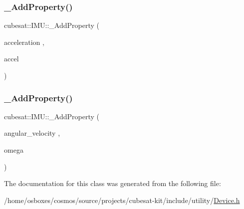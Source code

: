 \mbox{\label{classcubesat_1_1IMU_aedeb160bf398d47205b0206f1ee96fb7}} 
\subsubsection{\texorpdfstring{\+\_\+\+Add\+Property()}{\_AddProperty()}\hspace{0.1cm}{\footnotesize\ttfamily [8/9]}}
{\footnotesize\ttfamily cubesat\+::\+I\+M\+U\+::\+\_\+\+Add\+Property (\begin{DoxyParamCaption}\item[{acceleration}]{,  }\item[{accel}]{ }\end{DoxyParamCaption})}

\mbox{\label{classcubesat_1_1IMU_aace8a3f33f5c953bbdd456ccf77c9d8a}} 
\subsubsection{\texorpdfstring{\+\_\+\+Add\+Property()}{\_AddProperty()}\hspace{0.1cm}{\footnotesize\ttfamily [9/9]}}
{\footnotesize\ttfamily cubesat\+::\+I\+M\+U\+::\+\_\+\+Add\+Property (\begin{DoxyParamCaption}\item[{angular\+\_\+velocity}]{,  }\item[{omega}]{ }\end{DoxyParamCaption})}



The documentation for this class was generated from the following file\+:\begin{DoxyCompactItemize}
\item 
/home/osboxes/cosmos/source/projects/cubesat-\/kit/include/utility/\hyperlink{Device_8h}{Device.\+h}\end{DoxyCompactItemize}
